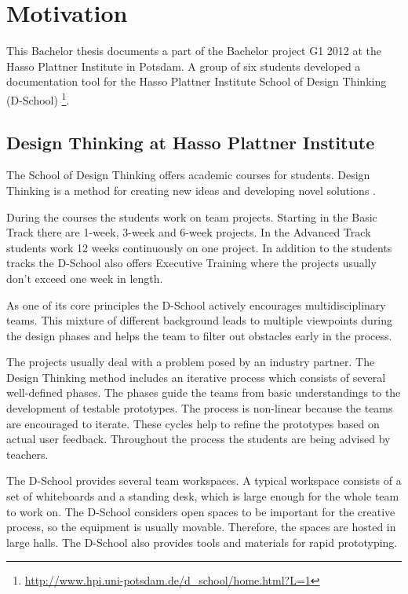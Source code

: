 \chapter{Motivation}

This Bachelor thesis documents a part of the Bachelor project G1 2012 at the Hasso Plattner Institute in Potsdam. A group of six students developed a documentation tool for the Hasso Plattner Institute School of Design Thinking (D-School) \footnote{\url{http://www.hpi.uni-potsdam.de/d_school/home.html?L=1}}. 

\section{Design Thinking at Hasso Plattner Institute}
The School of Design Thinking offers academic courses for students. Design Thinking is a method for creating new ideas and developing novel solutions \cite{Plattner_2009}. 

During the courses the students work on team projects. Starting in the Basic Track there are 1-week, 3-week and 6-week projects. In the Advanced Track students work 12 weeks continuously on one project. In addition to the students tracks the D-School also offers Executive Training where the projects usually don't exceed one week in length. 

As one of its core principles the D-School actively encourages multidisciplinary teams. This mixture of different background leads to multiple viewpoints during the design phases and helps the team to filter out obstacles early in the process. 

The projects usually deal with a problem posed by an industry partner. The Design Thinking method includes an iterative process which consists of several well-defined phases. The phases guide the teams from basic understandings to the development of testable prototypes. The process is non-linear because the teams are encouraged to iterate. These cycles help to refine the prototypes based on actual user feedback. Throughout the process the students are being advised by teachers. 

The D-School provides several team workspaces. A typical workspace consists of a set of whiteboards and a standing desk, which is large enough for the whole team to work on. The D-School considers open spaces to be important for the creative process, so the equipment is usually movable. Therefore, the spaces are hosted in large halls. The D-School also provides tools and materials for rapid prototyping.

